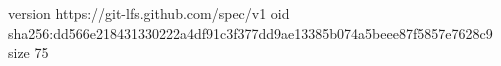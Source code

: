 version https://git-lfs.github.com/spec/v1
oid sha256:dd566e218431330222a4df91c3f377dd9ae13385b074a5beee87f5857e7628c9
size 75
